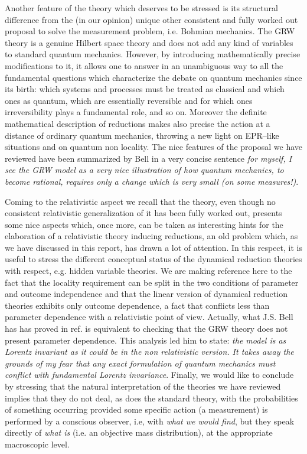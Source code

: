 \documentclass[10pt,a4paper]{article}
\begin{document}
Another feature of the theory which deserves to be stressed is its
structural difference from the (in our opinion) unique other
consistent and fully worked out proposal to solve the measurement
problem, i.e. Bohmian mechanics. The GRW theory is a genuine
Hilbert space theory and does not add any kind of variables to
standard quantum mechanics. However, by introducing mathematically
precise modifications to it, it allows one  to answer in an
unambiguous way to all the fundamental questions which characterize
the debate on quantum mechanics since its birth: which systems and
processes must be treated as classical and which ones as quantum,
which are essentially reversible and for which ones
irreversibility plays a fundamental role, and so on. Moreover the
definite mathematical description of reductions makes also precise
the action at a distance of ordinary quantum mechanics, throwing a
new light on EPR--like situations and on quantum non locality. The
nice features of the proposal we have reviewed have been
summarized by Bell in  a very concise sentence \cite{bells} {\it
for myself, I see the GRW model as a very nice illustration of how
quantum mechanics, to become rational, requires only a change
which is very small (on some measures!)}.

Coming to the relativistic aspect we recall that the theory, even
though no consistent relativistic generalization of it has  been
fully worked out, presents some nice aspects which, once more, can
be taken as interesting hints for the elaboration of a
relativistic theory inducing reductions, an old problem which, as
we have discussed in this report, has drawn a lot of attention. In
this respect, it is useful to stress the different conceptual
status of the dynamical reduction theories with respect, e.g.
hidden variable theories. We are making reference here to the fact
that the locality requirement can be split in the two conditions
of parameter and outcome independence and that  the linear version of
dynamical reduction theories  exhibits only outcome dependence, a fact
that conflicts less than parameter dependence with a relativistic point
of view.  Actually, what J.S.  Bell has has proved in ref.\cite{bells} is
equivalent to checking that the GRW theory does not present parameter
dependence. This analysis led him to state: {\it the model is as Lorentz
invariant as it could be in the non relativistic version. It takes away
the grounds of my fear that any exact formulation of quantum mechanics
must conflict with fundamental Lorentz invariance}. Finally, we would
like to conclude by stressing that the natural interpretation of the
theories we have reviewed implies that they do not deal, as does  the
standard theory, with the probabilities of something occurring provided
some specific action (a measurement) is performed by a conscious
observer, i.e, with {\it what we would find},  but they speak directly of
{\it what  is}  (i.e. an objective mass distribution), at the appropriate
macroscopic level.
\end{document}
